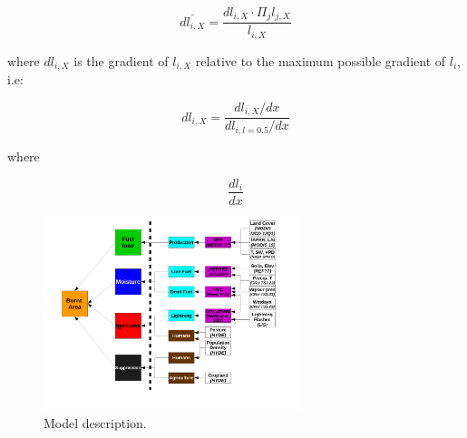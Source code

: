 \begin{equation}
    \bar{dl_{i, X}} = \frac{dl_{i, X} \cdot \Pi_{j} l_{j, X}}{l_{i, X}}
\end{equation}

where $dl_{i, X}$ is the gradient of $l_{i, X}$ relative to the maximum possible gradient of $l_{i}$, i.e:

\begin{equation}
    dl_{i, X} = \frac{dl_{i, X} / dx}{dl_{i, l = 0.5} / dx}
\end{equation}

where

\begin{equation}
    \frac{dl_{i}}{dx}
\end{equation}

\begin{figure}[!ht]
  \centering
    \includegraphics[width=0.67\textwidth]{Model_schematic.pdf}
  \caption{Model description.}
\end{figure}
